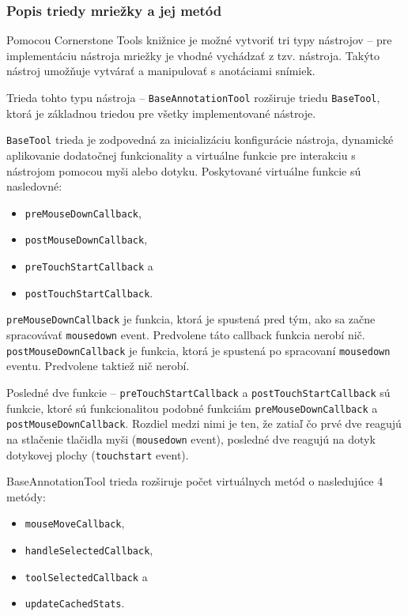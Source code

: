 
\subsubsection {Popis triedy mriežky a jej metód}
Pomocou Cornerstone Tools knižnice je možné vytvoriť tri typy nástrojov -- pre implementáciu nástroja mriežky je vhodné vychádzať z tzv.  nástroja. Takýto nástroj umožňuje vytvárať a manipulovať s anotáciami snímiek.

Trieda tohto typu nástroja -- \texttt{BaseAnnotationTool} rozširuje triedu \texttt{BaseTool}, ktorá je základnou triedou pre všetky implementované nástroje.

\texttt{BaseTool} trieda je zodpovedná za inicializáciu konfigurácie nástroja, dynamické aplikovanie dodatočnej funkcionality a virtuálne funkcie pre interakciu s nástrojom pomocou myši alebo dotyku.  Poskytované virtuálne funkcie sú nasledovné:
\begin {itemize}
\item {\texttt{preMouseDownCallback},}
\item {\texttt{postMouseDownCallback},}
\item {\texttt{preTouchStartCallback} a}
\item {\texttt{postTouchStartCallback}.}
\end {itemize}

\texttt{preMouseDownCallback} je funkcia, ktorá je spustená pred tým, ako sa začne spracovávať \texttt{mousedown} event. Predvolene táto callback funkcia nerobí nič.
\texttt{postMouseDownCallback} je funkcia, ktorá je spustená po spracovaní \texttt{mousedown} eventu. Predvolene taktiež nič nerobí.

Posledné dve funkcie -- \texttt{preTouchStartCallback} a \texttt{postTouchStartCallback} sú funkcie, ktoré sú funkcionalitou podobné funkciám \texttt{preMouseDownCallback} a \texttt{postMouseDownCallback}. Rozdiel medzi nimi je ten, že zatiaľ čo prvé dve reagujú na stlačenie tlačidla myši (\texttt{mousedown} event), posledné dve reagujú na dotyk dotykovej plochy (\texttt{touchstart} event).

BaseAnnotationTool trieda rozširuje počet virtuálnych metód o nasledujúce 4 metódy:
\begin {itemize}
\item {\texttt{mouseMoveCallback},}
\item {\texttt{handleSelectedCallback},}
\item {\texttt{toolSelectedCallback} a}
\item {\texttt{updateCachedStats}.}
\end {itemize}

